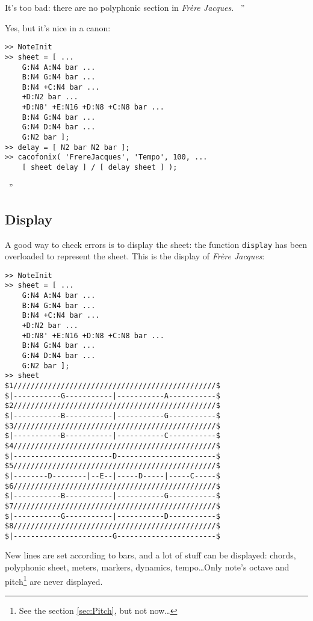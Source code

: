\documentclass{article}
\newcommand{\frerejaques}{\emph{Fr\`ere Jacques}\xspace}
\newenvironment{meenv}{ \par \noindent \makebox[6em][r]{ \textcolor{mecolor}{Me}: `` --~}}{~''}
\newenvironment{myselfenv}{ \par \noindent \makebox[6em][r]{ \textcolor{myselfcolor}{Myself}: `` --~}}{~''}
\begin{document}
\begin{meenv}%
It's too bad: there are no polyphonic section in \frerejaques.%
\end{meenv}
\begin{myselfenv}%
Yes, but it's nice in a canon:

\begin{lstlisting}
>> NoteInit
>> sheet = [ ...
	G:N4 A:N4 bar ...
	B:N4 G:N4 bar ...
	B:N4 +C:N4 bar ...
	+D:N2 bar ...
	+D:N8' +E:N16 +D:N8 +C:N8 bar ...
	B:N4 G:N4 bar ...
	G:N4 D:N4 bar ...
	G:N2 bar ];
>> delay = [ N2 bar N2 bar ];
>> cacofonix( 'FrereJacques', 'Tempo', 100, ...
	[ sheet delay ] / [ delay sheet ] );
\end{lstlisting}%
\end{myselfenv}

\subsection{Display}

A good way to check errors is to display the sheet: the function \lstinline!display! has been overloaded to represent the sheet. This is the display of \frerejaques:
\begin{lstlisting}
>> NoteInit
>> sheet = [ ...
	G:N4 A:N4 bar ...
	B:N4 G:N4 bar ...
	B:N4 +C:N4 bar ...
	+D:N2 bar ...
	+D:N8' +E:N16 +D:N8 +C:N8 bar ...
	B:N4 G:N4 bar ...
	G:N4 D:N4 bar ...
	G:N2 bar ];
>> sheet
$1///////////////////////////////////////////////$
$|-----------G-----------|-----------A-----------$
$2///////////////////////////////////////////////$
$|-----------B-----------|-----------G-----------$
$3///////////////////////////////////////////////$
$|-----------B-----------|-----------C-----------$
$4///////////////////////////////////////////////$
$|-----------------------D-----------------------$
$5///////////////////////////////////////////////$
$|--------D--------|--E--|-----D-----|-----C-----$
$6///////////////////////////////////////////////$
$|-----------B-----------|-----------G-----------$
$7///////////////////////////////////////////////$
$|-----------G-----------|-----------D-----------$
$8///////////////////////////////////////////////$
$|-----------------------G-----------------------$
\end{lstlisting}

New lines are set according to bars, and a lot of stuff can be displayed: chords, polyphonic sheet, meters, markers, dynamics, tempo\dots Only note's octave and pitch\footnote{See the section \ref{sec:Pitch}, but not now\dots} are never displayed.
\end{document}
